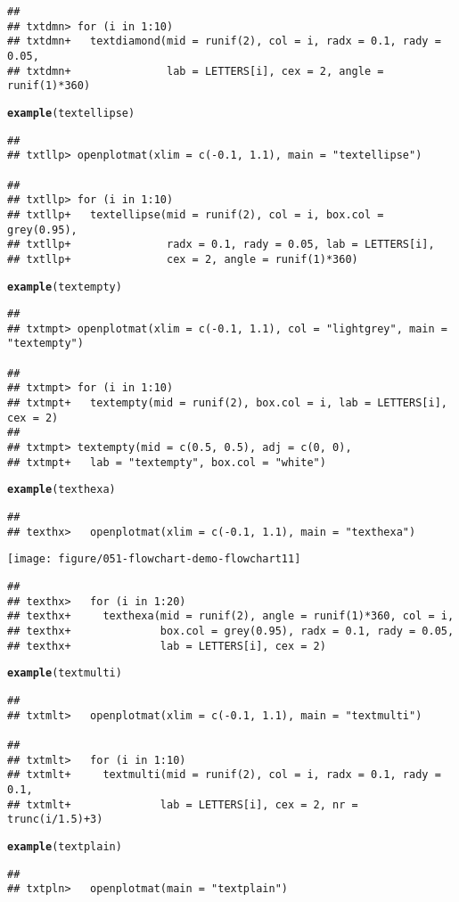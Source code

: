 \documentclass{article}\usepackage[]{graphicx}\usepackage[]{color}
\makeatletter
\def\maxwidth{ %
  \ifdim\Gin@nat@width>\linewidth
    \linewidth
  \else
    \Gin@nat@width
  \fi
}
\newcommand{\hlfunctioncall}[1]{\textcolor[rgb]{0.501960784313725,0,0.329411764705882}{\textbf{#1}}}%
\newenvironment{kframe}{%
 \def\at@end@of@kframe{}%
 \ifinner\ifhmode%
  \def\at@end@of@kframe{\end{minipage}}%
  \begin{minipage}{\columnwidth}%
 \fi\fi%
 \def\FrameCommand##1{\hskip\@totalleftmargin \hskip-\fboxsep
 \colorbox{shadecolor}{##1}\hskip-\fboxsep
     \hskip-\linewidth \hskip-\@totalleftmargin \hskip\columnwidth}%
 \MakeFramed {\advance\hsize-\width
   \@totalleftmargin\z@ \linewidth\hsize
   \@setminipage}}%
 {\par\unskip\endMakeFramed%
 \at@end@of@kframe}
\newenvironment{knitrout}{}{} %
\makeatother
\begin{document}
\begin{knitrout}
\begin{kframe}
\begin{verbatim}
## 
## txtdmn> for (i in 1:10) 
## txtdmn+   textdiamond(mid = runif(2), col = i, radx = 0.1, rady = 0.05,
## txtdmn+               lab = LETTERS[i], cex = 2, angle = runif(1)*360)
\end{verbatim}
\begin{alltt}
\hlfunctioncall{example}(textellipse)
\end{alltt}
\begin{verbatim}
## 
## txtllp> openplotmat(xlim = c(-0.1, 1.1), main = "textellipse")

## 
## txtllp> for (i in 1:10) 
## txtllp+   textellipse(mid = runif(2), col = i, box.col = grey(0.95),
## txtllp+               radx = 0.1, rady = 0.05, lab = LETTERS[i],
## txtllp+               cex = 2, angle = runif(1)*360)
\end{verbatim}
\begin{alltt}
\hlfunctioncall{example}(textempty)
\end{alltt}
\begin{verbatim}
## 
## txtmpt> openplotmat(xlim = c(-0.1, 1.1), col = "lightgrey", main = "textempty")

## 
## txtmpt> for (i in 1:10) 
## txtmpt+   textempty(mid = runif(2), box.col = i, lab = LETTERS[i], cex = 2)
## 
## txtmpt> textempty(mid = c(0.5, 0.5), adj = c(0, 0), 
## txtmpt+   lab = "textempty", box.col = "white")
\end{verbatim}
\begin{alltt}
\hlfunctioncall{example}(texthexa)
\end{alltt}
\begin{verbatim}
## 
## texthx>   openplotmat(xlim = c(-0.1, 1.1), main = "texthexa")
\end{verbatim}
\end{kframe}
\texttt{[image: figure/051-flowchart-demo-flowchart11]} 
\begin{kframe}\begin{verbatim}
## 
## texthx>   for (i in 1:20) 
## texthx+     texthexa(mid = runif(2), angle = runif(1)*360, col = i,
## texthx+              box.col = grey(0.95), radx = 0.1, rady = 0.05,
## texthx+              lab = LETTERS[i], cex = 2)
\end{verbatim}
\begin{alltt}
\hlfunctioncall{example}(textmulti)
\end{alltt}
\begin{verbatim}
## 
## txtmlt>   openplotmat(xlim = c(-0.1, 1.1), main = "textmulti")

## 
## txtmlt>   for (i in 1:10) 
## txtmlt+     textmulti(mid = runif(2), col = i, radx = 0.1, rady = 0.1,
## txtmlt+              lab = LETTERS[i], cex = 2, nr = trunc(i/1.5)+3)
\end{verbatim}
\begin{alltt}
\hlfunctioncall{example}(textplain)
\end{alltt}
\begin{verbatim}
## 
## txtpln>   openplotmat(main = "textplain")


\end{verbatim}
\end{kframe}
\end{knitrout}
\end{document}
